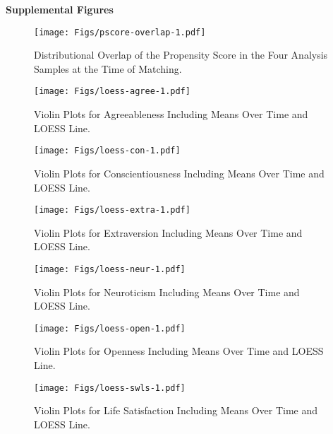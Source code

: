\documentclass[
  english,
  man, noextraspace,floatsintext]{apa7}
\newenvironment{lltable}{\begin{landscape}\begin{center}\begin{ThreePartTable}}{\end{ThreePartTable}\end{center}\end{landscape}}
\begin{document}
\begin{appendix}
\begin{lltable}
{}

\end{lltable}

\noindent \textbf{Supplemental Figures}




\begin{figure}
\centering
\texttt{[image: Figs/pscore-overlap-1.pdf]}
\caption{\label{fig:pscore-overlap}Distributional Overlap of the Propensity Score
in the Four Analysis Samples at the Time of Matching.}
\end{figure}




\begin{figure}
\centering
\texttt{[image: Figs/loess-agree-1.pdf]}
\caption{\label{fig:loess-agree}Violin Plots for Agreeableness Including Means
Over Time and LOESS Line.}
\end{figure}




\begin{figure}
\centering
\texttt{[image: Figs/loess-con-1.pdf]}
\caption{\label{fig:loess-con}Violin Plots for Conscientiousness Including Means
Over Time and LOESS Line.}
\end{figure}




\begin{figure}
\centering
\texttt{[image: Figs/loess-extra-1.pdf]}
\caption{\label{fig:loess-extra}Violin Plots for Extraversion Including Means Over
Time and LOESS Line.}
\end{figure}




\begin{figure}
\centering
\texttt{[image: Figs/loess-neur-1.pdf]}
\caption{\label{fig:loess-neur}Violin Plots for Neuroticism Including Means Over
Time and LOESS Line.}
\end{figure}




\begin{figure}
\centering
\texttt{[image: Figs/loess-open-1.pdf]}
\caption{\label{fig:loess-open}Violin Plots for Openness Including Means Over Time
and LOESS Line.}
\end{figure}




\begin{figure}
\centering
\texttt{[image: Figs/loess-swls-1.pdf]}
\caption{\label{fig:loess-swls}Violin Plots for Life Satisfaction Including Means
Over Time and LOESS Line.}
\end{figure}











\end{appendix}
\end{document}
